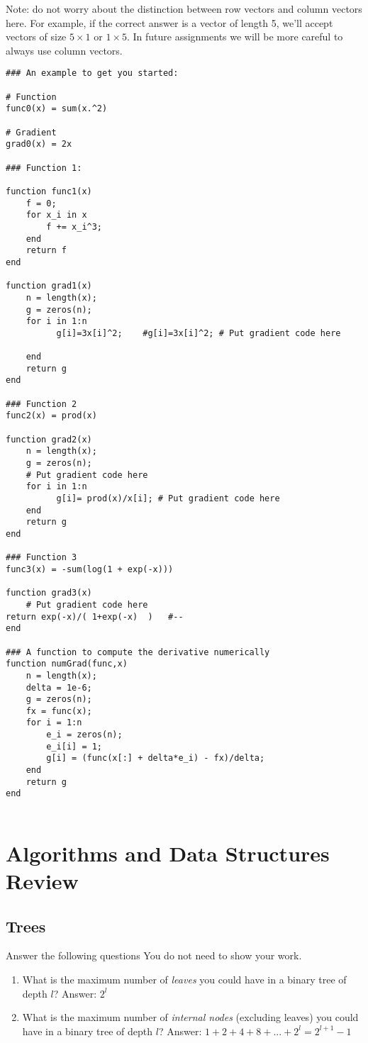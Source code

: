 \documentclass{article}
\def\blu#1{{\color{blu}#1}}
\begin{document}
Note: do not worry about the distinction between row vectors and column vectors here.
For example, if the correct answer is a vector of length 5, we'll accept vectors of size $5 \times 1$ or $1 \times 5$. In future assignments we will be more careful to always use column vectors.


\begin{lstlisting}
### An example to get you started:

# Function
func0(x) = sum(x.^2)

# Gradient
grad0(x) = 2x

### Function 1:

function func1(x)
	f = 0;
	for x_i in x
		f += x_i^3;
	end
	return f
end

function grad1(x)
	n = length(x);
	g = zeros(n);
	for i in 1:n
		  g[i]=3x[i]^2;    #g[i]=3x[i]^2; # Put gradient code here
		  
	end
	return g
end

### Function 2
func2(x) = prod(x)

function grad2(x)
	n = length(x);
	g = zeros(n);
	# Put gradient code here 
	for i in 1:n
		  g[i]= prod(x)/x[i]; # Put gradient code here
	end
	return g
end

### Function 3
func3(x) = -sum(log(1 + exp(-x)))

function grad3(x)
	# Put gradient code here
return exp(-x)/( 1+exp(-x)  )	#--
end

### A function to compute the derivative numerically
function numGrad(func,x)
	n = length(x);
	delta = 1e-6;
	g = zeros(n);
	fx = func(x);
	for i = 1:n
		e_i = zeros(n);
		e_i[i] = 1;
		g[i] = (func(x[:] + delta*e_i) - fx)/delta;
	end
	return g
end


\end{lstlisting}

\section{Algorithms and Data Structures Review}

\subsection{Trees}

\blu{Answer the following questions} You do not need to show your work.
\begin{enumerate}
\item What is the maximum number of \emph{leaves} you could have in a binary tree of depth $l$?
Answer: $2^l$
\item What is the maximum number of \emph{internal nodes} (excluding leaves) you could have in a binary tree of depth $l$?
Answer: $1+2+4+8+...+2^{l} = 2^{l+1}-1$
\end{enumerate}
\end{document}
